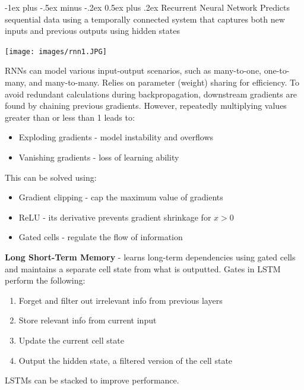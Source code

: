 \documentclass[10pt,landscape]{article}
\makeatletter
\renewcommand{\section}{\@startsection{section}{1}{0mm}%
                                {-1ex plus -.5ex minus -.2ex}%
                                {0.5ex plus .2ex}%
                                {\normalfont\large\bfseries}}
\makeatother
\begin{document}
\begin{multicols}{3}
\section{Recurrent Neural Network}
Predicts sequential data using a temporally connected system that captures both new inputs and previous outputs using hidden states
\begin{center}
\vspace{-2mm}
    \texttt{[image: images/rnn1.JPG]}
\end{center}
\vspace{-2mm}

RNNs can model various input-output scenarios, such as many-to-one, one-to-many, and many-to-many. Relies on parameter (weight) sharing for efficiency. To avoid redundant calculations during backpropagation, downstream gradients are found by chaining previous gradients. However, repeatedly multiplying values greater than or less than 1 leads to:
\begin{itemize}[label={--},leftmargin=4mm]
\itemsep -.4mm
\item Exploding gradients - model instability and overflows
\item Vanishing gradients - loss of learning ability
\end{itemize}
This can be solved using:
\begin{itemize}[label={--},leftmargin=4mm]
\itemsep -.4mm
\item Gradient clipping - cap the maximum value of gradients
\item ReLU - its derivative prevents gradient shrinkage for $x > 0$
\item Gated cells - regulate the flow of information
\end{itemize}

\textbf{Long Short-Term Memory} - learns long-term dependencies using gated cells and maintains a separate cell state from what is outputted. Gates in LSTM perform the following:

\begin{enumerate}[leftmargin=5mm]
\itemsep -.4mm
\item Forget and filter out irrelevant info from previous layers
\item Store relevant info from current input
\item Update the current cell state
\item Output the hidden state, a filtered version of the cell state
\end{enumerate}
LSTMs can be stacked to improve performance.


\end{multicols}
\end{document}
